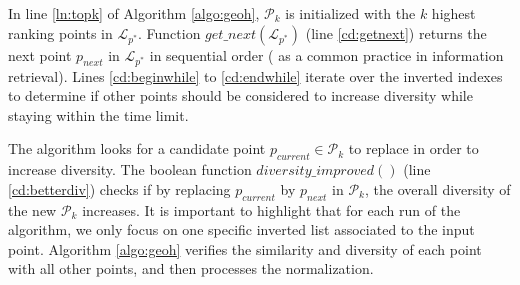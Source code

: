 \documentclass[sigconf,edbt]{acmart-edbt2019}
\begin{document}
\vspace{2pt}
In line \ref{ln:topk} of Algorithm \ref{algo:geoh}, $\mathcal{P}_k$ is initialized with the $k$ highest ranking points in ${\mathcal L}_{p^*}$. Function $get\_next({\mathcal L}_{p^*})$ (line \ref{cd:getnext}) returns the next point $p_{next}$ in ${\mathcal L}_{p^*}$ in sequential order ( as a common practice in information retrieval). Lines \ref{cd:beginwhile} to \ref{cd:endwhile} iterate over the inverted indexes to determine if other points should be considered to increase diversity while staying within the time limit.

\vspace{2pt}
The algorithm looks for a candidate point $p_{\mathit current} \in {\mathcal P}_k$ to replace in order to increase diversity. The boolean function $\mathit{diversity\_improved}()$ (line \ref{cd:betterdiv}) checks if by replacing $p_{current}$ by $p_{next}$ in ${\mathcal P}_k$, the overall diversity of the new ${\mathcal P}_k$ increases. It is important to highlight that for each run of the algorithm, we only focus on one specific inverted list associated to the input point. Algorithm \ref{algo:geoh} verifies the similarity  and diversity of each point with all other points, and then processes the normalization.




\end{document}
